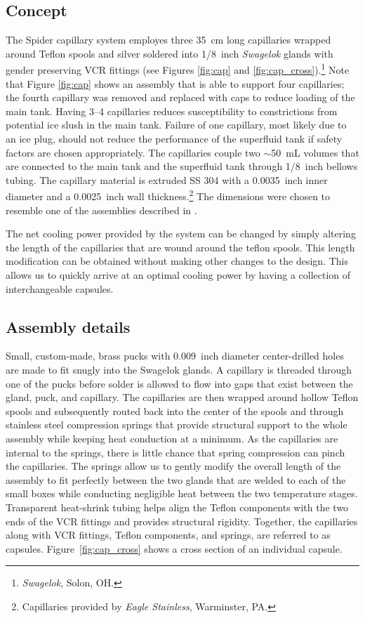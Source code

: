 \documentclass[
12pt, %
letterpaper, %
oneside, %
headinclude, footinclude, %
BCOR5mm, %
]{scrartcl}
\newcommand{\spider}{{\sc Spider} }
\begin{document}
\subsection{Concept}

The \spider capillary system employes three 35~cm long capillaries wrapped around Teflon spools and silver soldered into 1/8~inch \textit{Swagelok} glands with gender preserving VCR fittings (see Figures \ref{fig:cap} and \ref{fig:cap_cross}).\footnote{\textit{Swagelok}, Solon, OH.} Note that Figure \ref{fig:cap} shows an assembly that is able to support four capillaries; the fourth capillary was removed and replaced with caps to reduce loading of the main tank. Having 3--4 capillaries reduces susceptibility to constrictions from potential ice slush in the main tank. Failure of one capillary, most likely due to an ice plug, should not reduce the performance of the superfluid tank if safety factors are chosen appropriately. The capillaries couple two $\sim$50~mL volumes that are connected to the main tank and the superfluid tank through 1/8~inch bellows tubing. The capillary material is extruded SS 304 with a 0.0035~inch inner diameter and a 0.0025~inch wall thickness.\footnote{Capillaries provided by \textit{Eagle Stainless}, Warminster, PA.} The dimensions were chosen to resemble one of the assemblies described in \cite{Delong1970}. 

The net cooling power provided by the system can be changed by simply altering the length of the capillaries that are wound around the teflon spools. This length modification can be obtained without making other changes to the design.  This allows us to quickly arrive at an optimal cooling power by having a collection of interchangeable capsules.

\subsection{Assembly details}

Small, custom-made, brass pucks with 0.009~inch diameter
center-drilled holes are made to fit snugly into the Swagelok
glands. A capillary is threaded through one of the pucks before solder
is allowed to flow into gaps that exist between the gland, puck,
and capillary. The capillaries are then wrapped around hollow Teflon
spools and subsequently routed back into the center of the spools and
through stainless steel compression springs that provide structural
support to the whole assembly while keeping heat conduction at a
minimum. As the capillaries are internal to the springs, there is
little chance that spring compression can pinch the capillaries. The
springs allow us to gently modify the overall length of the assembly
to fit perfectly between the two glands that are welded to each of the
small boxes while conducting negligible heat between the two
temperature stages. Transparent heat-shrink tubing helps align the
Teflon components with the two ends of the VCR fittings and provides
structural rigidity. Together, the capillaries along with VCR
fittings, Teflon components, and springs, are referred to as
capsules. Figure~\ref{fig:cap_cross} shows a cross section of an
individual capsule. %
\end{document}
